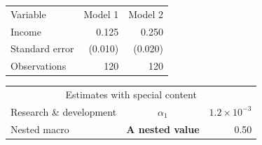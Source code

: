 \documentclass{article}
\begin{document}
\begin{tabular}{lrr}
Variable & Model 1 & Model 2 \\
Income & 0.125 & 0.250 \\
Standard error & (0.010) & (0.020) \\
Observations & 120 & 120 \\
\end{tabular}

\begin{tabular}{lcc}
\multicolumn{3}{c}{Estimates with special content} \\
Research \& development & $\alpha_{1}$ & $1.2 \times 10^{-3}$ \\
Nested macro & \textbf{A {nested} value} & \multicolumn{1}{r}{0.50} \\
\end{tabular}
\end{document}
